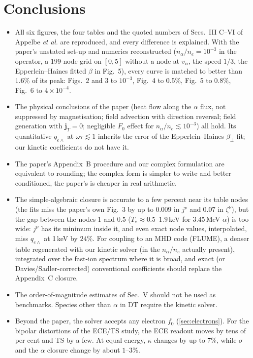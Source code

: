 \documentclass[11pt,a4paper]{article}
\newcommand{\ot}{\omega\tau}
\begin{document}
\section{Conclusions}\label{sec:conclusions}
\begin{itemize}
   \item All six figures, the four tables and the quoted numbers of Secs.~III C--VI of Appelbe \emph{et al.} are
         reproduced, and every difference is explained. With the paper's unstated set-up and numerics reconstructed
         ($n_\alpha/n_e=10^{-3}$ in the operator, a 199-node grid on $[0,5]$ without a node at $v_\alpha$, the speed $1/3$,
         the Epperlein--Haines fitted $\beta$ in Fig.~5), every curve is matched to better than $1.6\%$ of its peak:
         Figs.~2 and 3 to $10^{-3}$, Fig.~4 to $0.5\%$, Fig.~5 to $0.8\%$, Fig.~6 to $4\times10^{-4}$.
   \item The physical conclusions of the paper (heat flow along the $\alpha$ flux, not suppressed by magnetisation;
         field advection with direction reversal; field generation with $\mathbf j_T=0$; negligible $F_0$ effect for
         $n_\alpha/n_e\lesssim10^{-3}$) all hold. Its quantitative $q_{e\wedge}$ at $\ot\lesssim1$ inherits the error of
         the Epperlein--Haines $\beta_\perp$ fit; our kinetic coefficients do not have it.
   \item The paper's Appendix~B procedure and our complex formulation are equivalent to rounding; the complex form is
         simpler to write and better conditioned, the paper's is cheaper in real arithmetic.
   \item The simple-algebraic closure is accurate to a few percent near its table nodes (the fits miss the paper's own
         Fig.~3 by up to $0.009$ in $j^\nu$ and $0.07$ in $\zeta^\nu$), but the gap between the nodes 1 and 0.5
         ($T_e\approx0.5$--$1.9$\,keV for 3.45\,MeV $\alpha$) is too wide: $j^\nu$ has its minimum inside it, and even exact
         node values, interpolated, miss $q_{e\wedge}$ at 1\,keV by $24\%$. For coupling to an MHD code (FLUME), a denser
         table regenerated with our kinetic solver (in the $n_\alpha/n_e$ actually present), integrated over the
         fast-ion spectrum where it is broad, and exact (or Davies/Sadler-corrected) conventional coefficients should
         replace the Appendix~C closure.
   \item The order-of-magnitude estimates of Sec.~V should not be used as benchmarks. Species other than $\alpha$ in DT
         require the kinetic solver.
   \item Beyond the paper, the solver accepts any electron $f_0$ (\cref{sec:electrons}). For the bipolar distortions
         of the ECE/TS study, the ECE readout moves by tens of per cent and TS by a few. At equal energy, $\kappa$
         changes by up to $7\%$, while $\sigma$ and the $\alpha$ closure change by about $1$--$3\%$.
\end{itemize}
\end{document}
